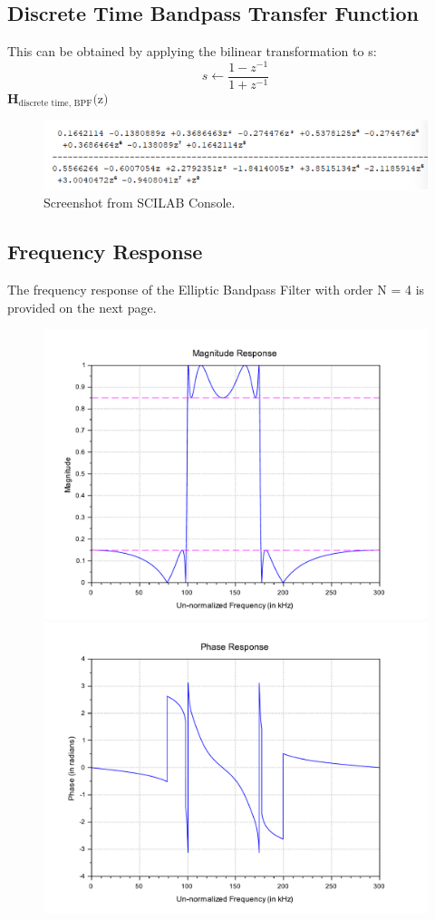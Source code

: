 \documentclass[12pt]{article}
\begin{document}
\subsection{Discrete Time Bandpass Transfer Function}
This can be obtained by applying the bilinear transformation to s:
\[s \leftarrow \frac{1 - z^{-1}}{1 + z^{-1}}\]
\textbf{H$_{\text{discrete time, BPF}}\text{(z)}$}
\begin{figure}[h]
    \centering
    \includegraphics[width=\textwidth]{h_bp.png}
    \caption{Screenshot from SCILAB Console.}
\end{figure}

\subsection{Frequency Response}
The frequency response of the Elliptic Bandpass Filter with order N = 4 is provided on the next page.

\begin{figure}
    \centering
    \includegraphics[scale=0.6]{mag_bp.pdf}
    \includegraphics[scale=0.6]{phase_bp.pdf}
\end{figure}
\end{document}
